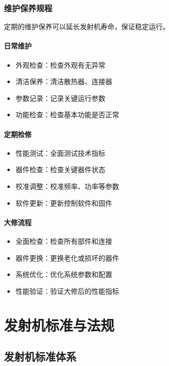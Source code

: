 \documentclass[12pt,UTF8]{ctexbook}
\begin{document}
\section{维护保养规程}

定期的维护保养可以延长发射机寿命，保证稳定运行。

\subsection{日常维护}
\begin{itemize}[leftmargin=3.5em]
    \item 外观检查：检查外观有无异常
    \item 清洁保养：清洁散热器、连接器
    \item 参数记录：记录关键运行参数
    \item 功能检查：检查基本功能是否正常
\end{itemize}

\subsection{定期检修}
\begin{itemize}[leftmargin=3.5em]
    \item 性能测试：全面测试技术指标
    \item 器件检查：检查关键器件状态
    \item 校准调整：校准频率、功率等参数
    \item 软件更新：更新控制软件和固件
\end{itemize}

\subsection{大修流程}
\begin{itemize}[leftmargin=3.5em]
    \item 全面检查：检查所有部件和连接
    \item 器件更换：更换老化或损坏的器件
    \item 系统优化：优化系统参数和配置
    \item 性能验证：验证大修后的性能指标
\end{itemize}

\part{发射机标准与法规}

\chapter{发射机标准体系}
\end{document}
